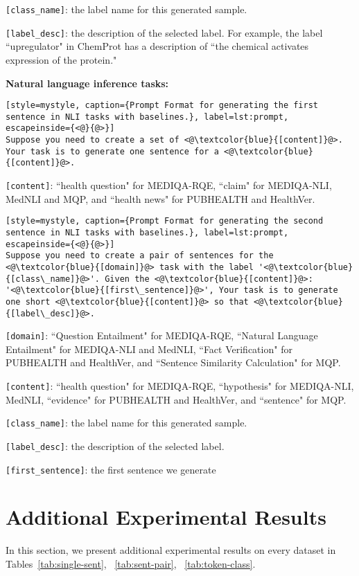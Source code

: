 \documentclass{article} %
\begin{document}
\texttt{[class\_name]}: the label name for this generated sample.

\texttt{[label\_desc]}: the description of the selected label. For example, the label ``upregulator" in ChemProt has a description of ``the chemical activates expression of the protein."

\textbf{Natural language inference tasks:}
\begin{lstlisting}[style=mystyle, caption={Prompt Format for generating the first sentence in NLI tasks with baselines.}, label=lst:prompt, escapeinside={<@}{@>}]
Suppose you need to create a set of <@\textcolor{blue}{[content]}@>. Your task is to generate one sentence for a <@\textcolor{blue}{[content]}@>.
\end{lstlisting}
\texttt{[content]}: ``health question" for MEDIQA-RQE, ``claim" for MEDIQA-NLI, MedNLI and MQP, and ``health news" for PUBHEALTH and HealthVer.


\begin{lstlisting}[style=mystyle, caption={Prompt Format for generating the second sentence in NLI tasks with baselines.}, label=lst:prompt, escapeinside={<@}{@>}]
Suppose you need to create a pair of sentences for the <@\textcolor{blue}{[domain]}@> task with the label '<@\textcolor{blue}{[class\_name]}@>'. Given the <@\textcolor{blue}{[content]}@>: '<@\textcolor{blue}{[first\_sentence]}@>', Your task is to generate one short <@\textcolor{blue}{[content]}@> so that <@\textcolor{blue}{[label\_desc]}@>.
\end{lstlisting}
\texttt{[domain]}: ``Question Entailment" for MEDIQA-RQE, ``Natural Language Entailment" for MEDIQA-NLI and MedNLI, ``Fact Verification" for PUBHEALTH and HealthVer, and ``Sentence Similarity Calculation" for MQP.

\texttt{[content]}: ``health question" for MEDIQA-RQE, ``hypothesis" for MEDIQA-NLI, MedNLI, ``evidence" for PUBHEALTH and HealthVer, and ``sentence" for MQP.

\texttt{[class\_name]}: the label name for this generated sample.

\texttt{[label\_desc]}: the description of the selected label.

\texttt{[first\_sentence]}: the first sentence we generate

\section{Additional Experimental Results}
In this section, we present additional experimental results on every dataset in Tables~\ref{tab:single-sent}, ~\ref{tab:sent-pair}, ~\ref{tab:token-class}.
\label{sec:more_experimental_results}


% 
% 

\end{document}
